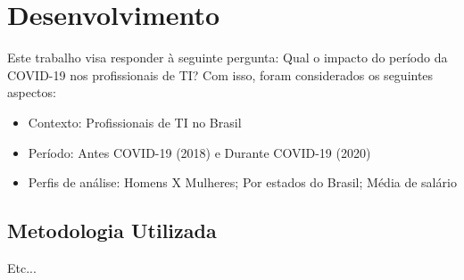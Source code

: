 \section{Desenvolvimento}

Este trabalho visa responder à seguinte pergunta: Qual o impacto do período da COVID-19 nos profissionais de TI? Com isso, foram considerados os seguintes aspectos:

\begin{itemize}
	\item Contexto: Profissionais de TI no Brasil
	\item Período: Antes COVID-19 (2018) e Durante COVID-19 (2020)
	\item Perfis de análise: Homens X Mulheres; Por estados do Brasil; Média de salário 
\end{itemize}

\subsection{Metodologia Utilizada}

Etc...